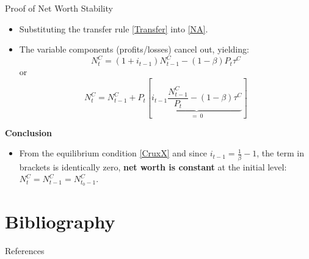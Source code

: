 \documentclass[11pt,aspectratio=169]{beamer}
\begin{document}
\begin{frame}{Proof of Net Worth Stability}
\small
\begin{itemize}
    \item Substituting the transfer rule \eqref{Transfer} into \eqref{NA}.
    \item The variable components (profits/losses) cancel out, yielding:
    \begin{equation*}
        N_{t}^{C}=(1+i_{t-1})N_{t-1}^{C}-(1-\beta )P_{t}\tau ^{C}
    \end{equation*}
or
    \begin{equation*}
        N_{t}^{C}=N_{t-1}^{C}+P_{t}\left[\underbrace{i_{t-1}\frac{N_{t-1}^{C}}{P_{t}}-(1-\beta)\tau ^{C}}_{= \ 0} \right]
    \end{equation*}

\end{itemize}

\vspace{0.2cm}

\textbf{Conclusion}
\begin{itemize}
    \item From the equilibrium condition \eqref{CruxX} and since $i_{t-1} = \frac{1}{\beta}-1$, the term in brackets is identically zero, \textbf{net worth is constant} at the initial level: $N_{t}^{C}=N_{t-1}^{C} = N_{t_{0}-1}^{C}$.
\end{itemize}
\vspace{0.2cm}
\begin{center}
\hyperlink{Equilibrium}{}
\end{center}
\end{frame}
\section{Bibliography}
\begin{frame}[allowframebreaks]{References}
    \printbibliography %
\end{frame}
\end{document}
